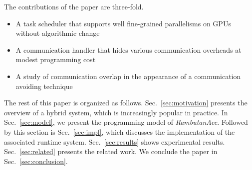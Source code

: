 The contributions of the paper are three-fold.
\begin{itemize}
\item A task scheduler that supports well fine-grained parallelisms on GPUs without algorithmic change
\item A communication handler that hides various communication overheads at modest programming cost
\item A study of communication overlap in the appearance of a communication avoiding technique 
\end{itemize}

The rest of this paper is organized as follows.
Sec.~\ref{sec:motivation} presents the overview of a hybrid system, which is increasingly popular in practice.
In Sec.~\ref{sec:model}, we present the programming model of {\em RambutanAcc}.
Followed by this section is Sec.~\ref{sec:impl}, which discusses the implementation of the associated runtime system.
Sec.~\ref{sec:results} shows experimental results.
Sec.~\ref{sec:related} presents the related work.
We conclude the paper in Sec.~\ref{sec:conclusion}.

